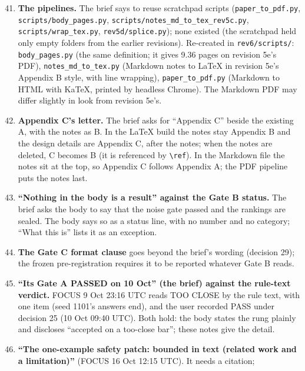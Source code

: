 \documentclass{article}
\theoremstyle{plain}
\theoremstyle{definition}
\theoremstyle{remark}
\begin{document}
\begin{enumerate}
  \setcounter{enumi}{40}
  \item \textbf{The pipelines.} The brief says to reuse scratchpad scripts
        (\nolinkurl{paper_to_pdf.py}, \nolinkurl{scripts/body_pages.py},
        \nolinkurl{scripts/notes_md_to_tex_rev5c.py},
        \nolinkurl{scripts/wrap_tex.py}, \nolinkurl{rev5d/splice.py}); none
        existed (the scratchpad held only empty folders from the earlier
        revisions). Re-created in \nolinkurl{rev6/scripts/}:
        \nolinkurl{body_pages.py} (the same definition; it gives 9.36 pages on
        revision 5e's PDF), \nolinkurl{notes_md_to_tex.py} (Markdown notes to
        LaTeX in revision 5e's Appendix B style, with line wrapping),
        \nolinkurl{paper_to_pdf.py} (Markdown to HTML with KaTeX, printed by
        headless Chrome). The Markdown PDF may differ slightly in look from
        revision 5e's.
  \item \textbf{Appendix C's letter.} The brief asks for ``Appendix C'' beside
        the existing A, with the notes as B. In the LaTeX build the notes stay
        Appendix B and the design details are Appendix C, after the notes; when
        the notes are deleted, C becomes B (it is referenced by
        \texttt{\textbackslash{}ref}). In the Markdown file the notes sit at the
        top, so Appendix C follows Appendix A; the PDF pipeline puts the notes
        last.
  \item \textbf{``Nothing in the body is a result'' against the Gate B status.}
        The brief asks the body to say that the noise gate passed and the
        rankings are sealed. The body says so as a status line, with no number
        and no category; ``What this is'' lists it as an exception.
  \item \textbf{The Gate C format clause} goes beyond the brief's wording
        (decision 29); the frozen pre-registration requires it to be reported
        whatever Gate B reads.
  \item \textbf{``Its Gate A PASSED on 10 Oct'' (the brief) against the
        rule-text verdict.} FOCUS 9 Oct 23:16 UTC reads TOO CLOSE by the rule
        text, with one item (seed 1101's answers end), and the user recorded
        PASS under decision 25 (10 Oct 09:40 UTC). Both hold: the body states
        the rung plainly and discloses ``accepted on a too-close bar''; these
        notes give the detail.
  \item \textbf{``The one-example safety patch: bounded in text (related work
        and a limitation)''} (FOCUS 16 Oct 12:15 UTC). It needs a citation;

\end{enumerate}
\end{document}
